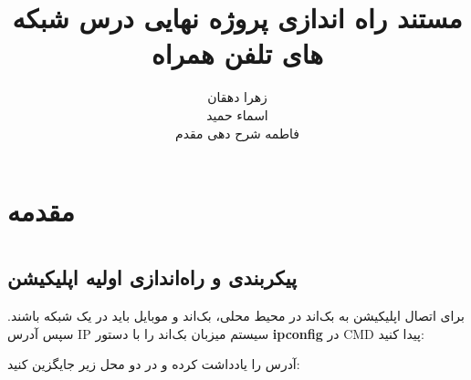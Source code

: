 \documentclass{report}
\title{مستند راه اندازی پروژه نهایی درس شبکه های تلفن همراه}
\author{زهرا دهقان\\اسماء حمید\\فاطمه شرح دهی مقدم}
\begin{document}
\Godpage
\maketitle
{}
\tableofcontents


\chapter{مقدمه}








\chapter{ }

\chapter{ }

\chapter{ }

\section{پیکربندی و راه‌اندازی اولیه اپلیکیشن}

برای اتصال اپلیکیشن به بک‌اند در محیط محلی، بک‌اند و موبایل باید در یک شبکه باشند. سپس آدرس IP سیستم میزبان بک‌اند را با دستور \textbf{ipconfig} در CMD پیدا کنید:

\vspace{0.3cm}

آدرس  را یادداشت کرده و در دو محل زیر جایگزین کنید:
\end{document}
